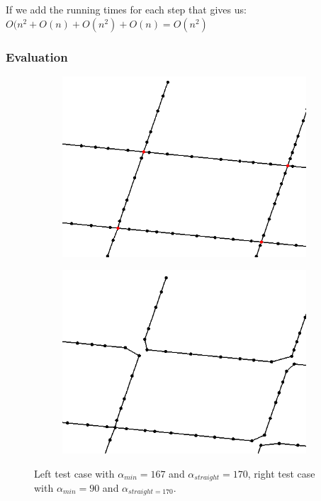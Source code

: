 \documentclass[11pt]{article}
\begin{document}
If we add the running times for each step that gives us: $O(n^2+O(n)+O(n^2)+O(n)=O(n^2)$

\subsubsection{Evaluation}

\begin{figure}[h]
\centering
  \begin{subfigure}{.4\linewidth}
  \centering
  \graphicspath{ {images/}}
  \includegraphics[width=\linewidth]{given167_170}
  \end{subfigure}
    \begin{subfigure}{0.4\linewidth}
  \centering
  \graphicspath{ {images/}}
  \includegraphics[width=\linewidth]{given90_90}
  \end{subfigure}
  \caption{Left test case with $\alpha_{min}=167$ and $\alpha_{straight}= 170$, right test case with $\alpha_{min}=90$ and $\alpha_{straight=170}$. }
  \label{}
\end{figure}
\end{document}
